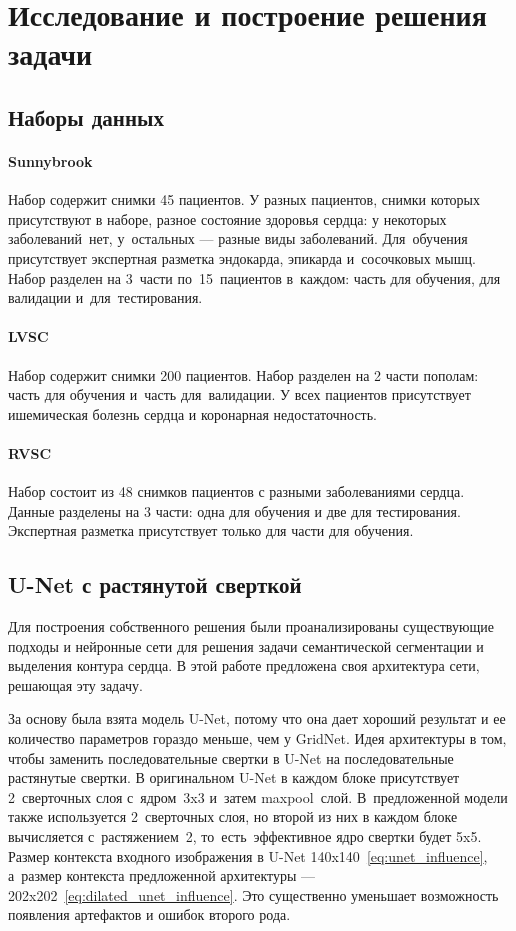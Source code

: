 \section{Исследование и построение решения задачи}

\subsection{Наборы данных}

\paragraph{Sunnybrook}

Набор содержит снимки 45 пациентов. У разных пациентов, снимки которых присутствуют в наборе, разное состояние здоровья сердца: у некоторых заболеваний~нет, у~остальных — разные виды заболеваний. Для~обучения присутствует экспертная разметка эндокарда, эпикарда и~сосочковых мышц. Набор разделен на 3~части по~15~пациентов в~каждом: часть для обучения, для валидации и~для~тестирования.

\paragraph{LVSC}

Набор содержит снимки 200 пациентов. Набор разделен на 2 части пополам: часть для обучения и~часть для~валидации. У всех пациентов присутствует ишемическая болезнь сердца и коронарная недостаточность.

\paragraph{RVSC}

Набор состоит из 48 снимков пациентов с разными заболеваниями сердца. Данные разделены на 3 части: одна для обучения и две для тестирования. Экспертная разметка присутствует только для части для обучения.

\subsection{U-Net с растянутой сверткой}

Для построения собственного решения были проанализированы существующие подходы и нейронные сети для решения задачи семантической сегментации и выделения контура сердца. В этой работе предложена своя архитектура сети, решающая эту задачу.

За основу была взята модель U-Net, потому что она дает хороший результат и ее количество параметров гораздо меньше, чем у GridNet. Идея архитектуры в том, чтобы заменить последовательные свертки в U-Net на последовательные растянутые свертки. В оригинальном U-Net в каждом блоке присутствует 2~сверточных слоя с~ядром~3x3 и~затем maxpool~слой. В~предложенной модели также используется 2~сверточных слоя, но второй из них в каждом блоке вычисляется с~растяжением~2, то~есть~эффективное ядро свертки будет 5x5. Размер контекста входного изображения в U-Net 140x140~\eqref{eq:unet_influence}, а~размер контекста предложенной архитектуры — 202x202~\eqref{eq:dilated_unet_influence}. Это существенно уменьшает возможность появления артефактов и ошибок второго рода.

